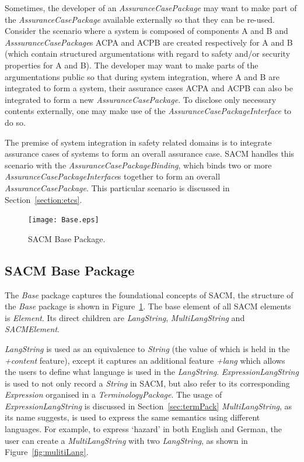 Sometimes, the developer of an \textit{AssuranceCasePackage} may want to make part of the \textit{AssuranceCasePackage} available externally so that they can be re-used. 
Consider the scenario where a system is composed of components A and B and \textit{AsssuranceCasePackage}s ACPA and ACPB are created respectively for A and B (which contain structured argumentations with regard to safety and/or security properties for A and B). 
The developer may want to make parts of the argumentations public so that during system integration, where A and B are integrated to form a system, their assurance cases ACPA and ACPB can also be integrated to form a new \textit{AssuranceCasePackage}. 
To disclose only necessary contents externally, one may make use of the \textit{AssuranceCasePackageInterface} to do so. 

The premise of system integration in safety related domains is to integrate assurance cases of systems to form an overall assurance case. SACM handles this scenario with the \textit{AssuranceCasePackageBinding}, which binds two or more \textit{AssuranceCasePackageInterface}s together to form an overall \textit{AssuranceCasePackage}. This particular scenario is discussed in Section~\ref{section:etcs}.
\begin{figure}
	\centering
	\texttt{[image: Base.eps]}
	\caption{SACM Base Package.}
	\label{fig:base}
\end{figure}

\subsection{SACM Base Package}
\label{sec:basePack}

The \textit{Base} package captures the foundational concepts of SACM, the structure of the \textit{Base} package is shown in Figure~\ref{fig:base}. 
The base element of all SACM elements is \textit{Element}. 
Its direct children are \textit{LangString}, \textit{MultiLangString} and \textit{SACMElement}.

\textit{LangString} is used as an equivalence to \textit{String} (the value of which is held in the \textit{+content} feature), except it captures an additional feature \textit{+lang} which allows the users to define what language is used in the \textit{LangString}. 
\textit{ExpressionLangString} is used to not only record a \textit{String} in SACM, but also refer to its corresponding \textit{Expression} organised in a \textit{TerminologyPackage}. 
The usage of \textit{ExpressionLangString} is discussed in Section~\ref{sec:termPack} \textit{MultiLangString}, as its name suggests, is used to express the same semantics using different languages. 
For example, to express `hazard' in both English and German, the user can create a \textit{MultiLangString} with two \textit{LangString}, as shown in Figure~\ref{fig:mulitiLang}.

